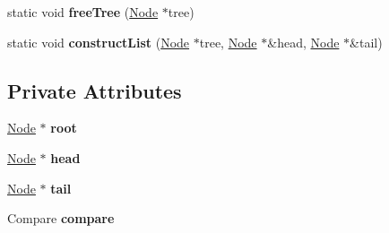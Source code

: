 \begin{DoxyCompactItemize}
\item 
\hypertarget{classbalanced__tree_ad9aabc3b1a9b330727a4f24ba141dc9d}{static void {\bfseries free\+Tree} (\hyperlink{structbalanced__tree_1_1Node}{Node} $\ast$tree)}\label{classbalanced__tree_ad9aabc3b1a9b330727a4f24ba141dc9d}

\item 
\hypertarget{classbalanced__tree_aa50bb9587128cd2c09d5d8bd2328911d}{static void {\bfseries construct\+List} (\hyperlink{structbalanced__tree_1_1Node}{Node} $\ast$tree, \hyperlink{structbalanced__tree_1_1Node}{Node} $\ast$\&head, \hyperlink{structbalanced__tree_1_1Node}{Node} $\ast$\&tail)}\label{classbalanced__tree_aa50bb9587128cd2c09d5d8bd2328911d}

\end{DoxyCompactItemize}
\subsection*{Private Attributes}
\begin{DoxyCompactItemize}
\item 
\hypertarget{classbalanced__tree_ab0c9fb0b7fb203df5ac8492022afb832}{\hyperlink{structbalanced__tree_1_1Node}{Node} $\ast$ {\bfseries root}}\label{classbalanced__tree_ab0c9fb0b7fb203df5ac8492022afb832}

\item 
\hypertarget{classbalanced__tree_ac2ebcc395419f3583fb5df2bbc29d617}{\hyperlink{structbalanced__tree_1_1Node}{Node} $\ast$ {\bfseries head}}\label{classbalanced__tree_ac2ebcc395419f3583fb5df2bbc29d617}

\item 
\hypertarget{classbalanced__tree_a848db23190ce79d425dc356d23dece71}{\hyperlink{structbalanced__tree_1_1Node}{Node} $\ast$ {\bfseries tail}}\label{classbalanced__tree_a848db23190ce79d425dc356d23dece71}

\item 
\hypertarget{classbalanced__tree_aa472b8cf7fd0e915283fe61ed0e6ab76}{Compare {\bfseries compare}}\label{classbalanced__tree_aa472b8cf7fd0e915283fe61ed0e6ab76}

\end{DoxyCompactItemize}
